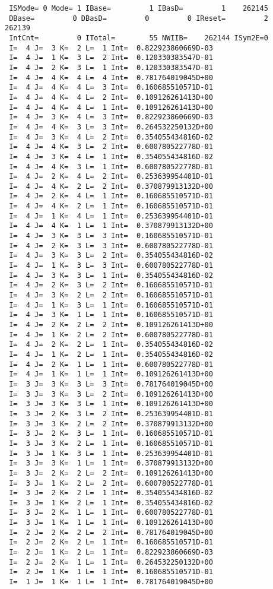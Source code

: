 \documentclass[10pt]{ctexrep}
\begin{document}
\begin{verbatim}
 ISMode= 0 Mode= 1 IBase=         1 IBasD=         1    262145
 DBase=         0 DBasD=         0         0 IReset=         2    262139
 IntCnt=         0 ITotal=        55 NWIIB=    262144 ISym2E=0
 I=  4 J=  3 K=  2 L=  1 Int=  0.822923860669D-03
 I=  4 J=  1 K=  3 L=  2 Int=  0.120330383547D-01
 I=  4 J=  2 K=  3 L=  1 Int=  0.120330383547D-01
 I=  4 J=  4 K=  4 L=  4 Int=  0.781764019045D+00
 I=  4 J=  4 K=  4 L=  3 Int=  0.160685510571D-01
 I=  4 J=  4 K=  4 L=  2 Int=  0.109126261413D+00
 I=  4 J=  4 K=  4 L=  1 Int=  0.109126261413D+00
 I=  4 J=  3 K=  4 L=  3 Int=  0.822923860669D-03
 I=  4 J=  4 K=  3 L=  3 Int=  0.264532250132D+00
 I=  4 J=  3 K=  4 L=  2 Int=  0.354055434816D-02
 I=  4 J=  4 K=  3 L=  2 Int=  0.600780522778D-01
 I=  4 J=  3 K=  4 L=  1 Int=  0.354055434816D-02
 I=  4 J=  4 K=  3 L=  1 Int=  0.600780522778D-01
 I=  4 J=  2 K=  4 L=  2 Int=  0.253639954401D-01
 I=  4 J=  4 K=  2 L=  2 Int=  0.370879913132D+00
 I=  4 J=  2 K=  4 L=  1 Int=  0.160685510571D-01
 I=  4 J=  4 K=  2 L=  1 Int=  0.160685510571D-01
 I=  4 J=  1 K=  4 L=  1 Int=  0.253639954401D-01
 I=  4 J=  4 K=  1 L=  1 Int=  0.370879913132D+00
 I=  4 J=  3 K=  3 L=  3 Int=  0.160685510571D-01
 I=  4 J=  2 K=  3 L=  3 Int=  0.600780522778D-01
 I=  4 J=  3 K=  3 L=  2 Int=  0.354055434816D-02
 I=  4 J=  1 K=  3 L=  3 Int=  0.600780522778D-01
 I=  4 J=  3 K=  3 L=  1 Int=  0.354055434816D-02
 I=  4 J=  2 K=  3 L=  2 Int=  0.160685510571D-01
 I=  4 J=  3 K=  2 L=  2 Int=  0.160685510571D-01
 I=  4 J=  1 K=  3 L=  1 Int=  0.160685510571D-01
 I=  4 J=  3 K=  1 L=  1 Int=  0.160685510571D-01
 I=  4 J=  2 K=  2 L=  2 Int=  0.109126261413D+00
 I=  4 J=  1 K=  2 L=  2 Int=  0.600780522778D-01
 I=  4 J=  2 K=  2 L=  1 Int=  0.354055434816D-02
 I=  4 J=  1 K=  2 L=  1 Int=  0.354055434816D-02
 I=  4 J=  2 K=  1 L=  1 Int=  0.600780522778D-01
 I=  4 J=  1 K=  1 L=  1 Int=  0.109126261413D+00
 I=  3 J=  3 K=  3 L=  3 Int=  0.781764019045D+00
 I=  3 J=  3 K=  3 L=  2 Int=  0.109126261413D+00
 I=  3 J=  3 K=  3 L=  1 Int=  0.109126261413D+00
 I=  3 J=  2 K=  3 L=  2 Int=  0.253639954401D-01
 I=  3 J=  3 K=  2 L=  2 Int=  0.370879913132D+00
 I=  3 J=  2 K=  3 L=  1 Int=  0.160685510571D-01
 I=  3 J=  3 K=  2 L=  1 Int=  0.160685510571D-01
 I=  3 J=  1 K=  3 L=  1 Int=  0.253639954401D-01
 I=  3 J=  3 K=  1 L=  1 Int=  0.370879913132D+00
 I=  3 J=  2 K=  2 L=  2 Int=  0.109126261413D+00
 I=  3 J=  1 K=  2 L=  2 Int=  0.600780522778D-01
 I=  3 J=  2 K=  2 L=  1 Int=  0.354055434816D-02
 I=  3 J=  1 K=  2 L=  1 Int=  0.354055434816D-02
 I=  3 J=  2 K=  1 L=  1 Int=  0.600780522778D-01
 I=  3 J=  1 K=  1 L=  1 Int=  0.109126261413D+00
 I=  2 J=  2 K=  2 L=  2 Int=  0.781764019045D+00
 I=  2 J=  2 K=  2 L=  1 Int=  0.160685510571D-01
 I=  2 J=  1 K=  2 L=  1 Int=  0.822923860669D-03
 I=  2 J=  2 K=  1 L=  1 Int=  0.264532250132D+00
 I=  2 J=  1 K=  1 L=  1 Int=  0.160685510571D-01
 I=  1 J=  1 K=  1 L=  1 Int=  0.781764019045D+00
\end{verbatim}
\end{document}
